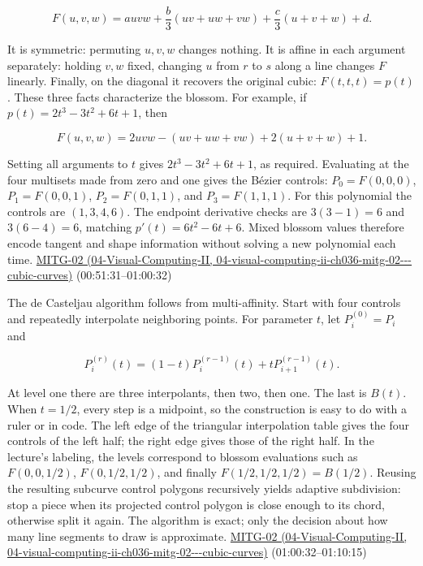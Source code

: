 \[
F(u,v,w)=a uvw+\frac b3(uv+uw+vw)+\frac c3(u+v+w)+d.
\]

It is symmetric: permuting \(u,v,w\) changes nothing. It is affine in each argument separately: holding \(v,w\) fixed, changing \(u\) from \(r\) to \(s\) along a line changes \(F\) linearly. Finally, on the diagonal it recovers the original cubic: \(F(t,t,t)=p(t)\). These three facts characterize the blossom. For example, if \(p(t)=2t^3-3t^2+6t+1\), then

\[
F(u,v,w)=2uvw-(uv+uw+vw)+2(u+v+w)+1.
\]

Setting all arguments to \(t\) gives \(2t^3-3t^2+6t+1\), as required. Evaluating at the four multisets made from zero and one gives the Bézier controls: \(P_0=F(0,0,0)\), \(P_1=F(0,0,1)\), \(P_2=F(0,1,1)\), and \(P_3=F(1,1,1)\). For this polynomial the controls are \((1,3,4,6)\). The endpoint derivative checks are \(3(3-1)=6\) and \(3(6-4)=6\), matching \(p'(t)=6t^2-6t+6\). Mixed blossom values therefore encode tangent and shape information without solving a new polynomial each time. \href{../04-Visual-Computing-II/main.pdf\#nameddest=04-visual-computing-ii-ch036-mitg-02---cubic-curves}{MITG-02 (04-Visual-Computing-II, 04-visual-computing-ii-ch036-mitg-02-\/-\/-cubic-curves)} (00:51:31--01:00:32)

The de Casteljau algorithm follows from multi-affinity. Start with four controls and repeatedly interpolate neighboring points. For parameter \(t\), let \(P_i^{(0)}=P_i\) and

\[
P_i^{(r)}(t)=(1-t)P_i^{(r-1)}(t)+tP_{i+1}^{(r-1)}(t).
\]

At level one there are three interpolants, then two, then one. The last is \(B(t)\). When \(t=1/2\), every step is a midpoint, so the construction is easy to do with a ruler or in code. The left edge of the triangular interpolation table gives the four controls of the left half; the right edge gives those of the right half. In the lecture's labeling, the levels correspond to blossom evaluations such as \(F(0,0,1/2)\), \(F(0,1/2,1/2)\), and finally \(F(1/2,1/2,1/2)=B(1/2)\). Reusing the resulting subcurve control polygons recursively yields adaptive subdivision: stop a piece when its projected control polygon is close enough to its chord, otherwise split it again. The algorithm is exact; only the decision about how many line segments to draw is approximate. \href{../04-Visual-Computing-II/main.pdf\#nameddest=04-visual-computing-ii-ch036-mitg-02---cubic-curves}{MITG-02 (04-Visual-Computing-II, 04-visual-computing-ii-ch036-mitg-02-\/-\/-cubic-curves)} (01:00:32--01:10:15)

